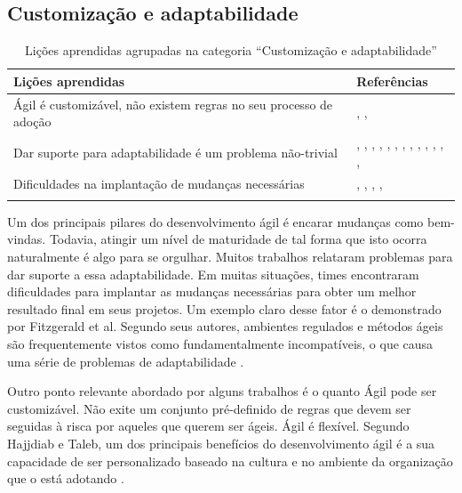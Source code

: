 \subsection{Customização e adaptabilidade}

\begin{table}[H]
	\centering
	\captionsetup{justification=centering}
	\begin{tabularx}{\linewidth}{ | X | p{5cm} | } \hline \textbf{Lições aprendidas} & \textbf{Referências} \\ \hline
		Ágil é customizável, não existem regras no seu processo de adoção & \cite{Hajjdiab2011}, \cite{Piegas2012}, \cite{Hui2013} \\ \hline
		Dar suporte para adaptabilidade é um problema não-trivial & \cite{Block2011}, \cite{Asnawi2012}, \cite{Fitzgerald2013}, \cite{Bustard2013}, \cite{Microsoft2013}, \cite{Lapham2012}, \cite{Claudia2013}, \cite{Nokia2013}, \cite{Rodrigues2013}, \cite{Bastos2013}, \cite{Maciel2013}, \cite{Hui2013}, \cite{Ahmed2008}, \cite{Sahota2012} \\ \hline
		Dificuldades na implantação de mudanças necessárias & \cite{Vieira2013}, \cite{Bastos2013}, \cite{Maciel2013}, \cite{Hui2013}, \cite{Sahota2012} \\ \hline
	\caption{Lições aprendidas agrupadas na categoria ``Customização e adaptabilidade''}
	\end{tabularx}
\end{table}

Um dos principais pilares do desenvolvimento ágil é encarar mudanças como bem-vindas. Todavia, atingir um nível de maturidade de tal forma que isto ocorra naturalmente é algo para se orgulhar. Muitos trabalhos relataram problemas para dar suporte a essa adaptabilidade. Em muitas situações, times encontraram dificuldades para implantar as mudanças necessárias para obter um melhor resultado final em seus projetos. Um exemplo claro desse fator é o demonstrado por Fitzgerald et al. Segundo seus autores, ambientes regulados e métodos ágeis são frequentemente vistos como fundamentalmente incompatíveis, o que causa uma série de problemas de adaptabilidade \cite{Fitzgerald2013}.

Outro ponto relevante abordado por alguns trabalhos é o quanto Ágil pode ser customizável. Não exite um conjunto pré-definido de regras que devem ser seguidas à risca por aqueles que querem ser ágeis. Ágil é flexível. Segundo Hajjdiab e Taleb, um dos principais benefícios do desenvolvimento ágil é a sua capacidade de ser personalizado baseado na cultura e no ambiente da organização que o está adotando \cite{Hajjdiab2011}.

